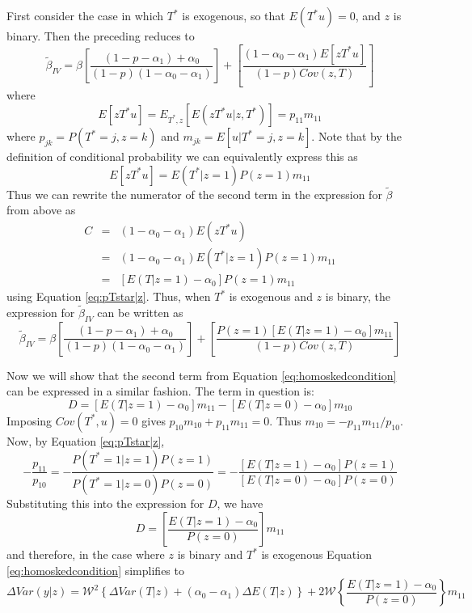 First consider the case in which $T^*$ is exogenous, so that $E(T^*u)=0$, and $z$ is binary.
Then the preceding reduces to
\begin{equation*}
  \widetilde{\beta}_{IV} = \beta\left[ \frac{\left( 1 - p - \alpha_1 \right) + \alpha_0}{(1-p)(1 - \alpha_0 - \alpha_1)} \right] + \left[ \frac{\left( 1 - \alpha_0 - \alpha_1 \right)E[zT^*u] }{(1-p) Cov(z,T)} \right]
\end{equation*}
where
\begin{equation*}
  E[zT^*u] = E_{T^*,z}\left[ E\left( zT^*u |z,T^*\right) \right] = p_{11} m_{11}
\end{equation*}
where $p_{jk}=P(T^*=j, z=k)$ and $m_{jk}=E[u|T^*=j,z=k]$.
Note that by the definition of conditional probability we can equivalently express this as
\begin{equation*}
  E[zT^*u]= E(T^*|z=1)P(z=1)m_{11}
\end{equation*}
Thus we can rewrite the numerator of the second term in the expression for  $\widetilde{\beta}$ from above as
\begin{eqnarray*}
  C &=& (1-\alpha_0 - \alpha_1) E(zT^*u)\\
  &=& (1-\alpha_0-\alpha_1) E(T^*|z=1)P(z=1)m_{11}\\
  &=& \left[ E(T|z=1) - \alpha_0 \right]P(z=1)m_{11}
\end{eqnarray*}
using Equation \ref{eq:pTstar|z}.
Thus, when $T^*$ is exogenous and $z$ is binary, the expression for $\widetilde{\beta}_{IV}$ can be written as
\begin{equation}
  \widetilde{\beta}_{IV} = \beta\left[ \frac{\left( 1 - p - \alpha_1 \right) + \alpha_0}{(1-p)(1 - \alpha_0 - \alpha_1)} \right] + \left[ \frac{P(z=1) \left[ E(T|z=1)- \alpha_0 \right]m_{11} }{(1-p) Cov(z,T)} \right]
\end{equation}

Now we will show that the second term from Equation \ref{eq:homoskedcondition} can be expressed in a similar fashion.
The term in question is:
\begin{equation*}
  D = \left[ E\left( T|z=1 \right)-\alpha_0 \right]m_{11} - \left[ E\left( T|z=0 \right) - \alpha_0 \right] m_{10}
\end{equation*}
Imposing $Cov(T^*,u)=0$ gives $p_{10}m_{10} + p_{11}m_{11}=0$.
Thus $m_{10} = -p_{11}m_{11}/p_{10}$.
Now, by Equation \ref{eq:pTstar|z},
\begin{equation*}
  -\frac{p_{11}}{p_{10}} = -\frac{P(T^*=1|z=1)P(z=1)}{P(T^*=1|z=0)P(z=0)} = -\frac{\left[ E(T|z=1) - \alpha_0 \right]P(z=1)}{\left[ E(T|z=0) - \alpha_0 \right]P(z=0)}
\end{equation*}
Substituting this into the expression for $D$, we have
\begin{equation*}
  D = \left[ \frac{E(T|z=1) - \alpha_0}{P(z=0)} \right]m_{11}
\end{equation*}
and therefore, in the case where $z$ is binary and $T^*$ is exogenous Equation \ref{eq:homoskedcondition} simplifies to
\begin{equation}
  \Delta Var(y|z)= \mathcal{W}^2 \left\{ \Delta Var(T|z) + (\alpha_0 - \alpha_1)\Delta E(T|z) \right\} + 2 \mathcal{W}\left\{\frac{E(T|z=1) - \alpha_0}{P(z=0)}  \right\} m_{11}
\end{equation}

